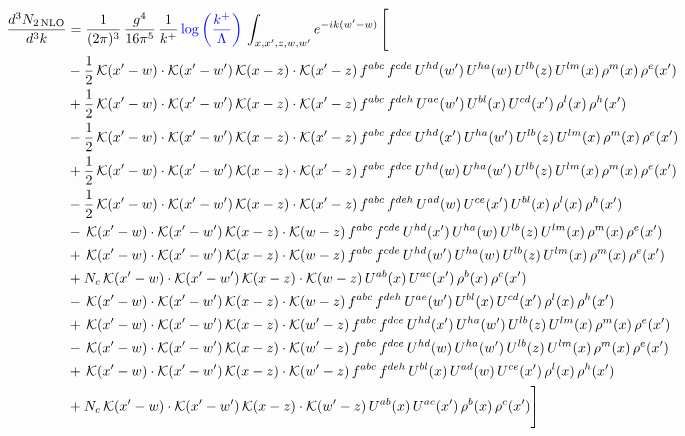 \documentclass[9pt]{article}
\numberwithin{equation}{section}
\begin{document}
\begin{align}
\frac{d^{3}N_{2\,\mathrm{NLO}}}{d^{3}k} & = \frac{1}{(2\pi)^{3}}\,\frac{g^{4}}{16\pi^{5}}\,\frac{1}{k^{+}}\,{\color{blue}\log{\left(\frac{k^{+}}{\Lambda}\right)}}\,\int_{x,x',z,w,w'}e^{-ik(w'-w)}\,\Bigg[\notag\\ & -\frac{1}{2}\,\mathcal{K}(x'-w)\cdot\mathcal{K}(x'-w')\,\mathcal{K}(x-z)\cdot\mathcal{K}(x'-z)\,f^{abc}\,f^{cde}\,U^{hd}(w')\,U^{ha}(w)\,U^{lb}(z)\,U^{lm}(x)\,\rho^{m}(x)\,\rho^{e}(x')\notag\\
& +\frac{1}{2}\,\mathcal{K}(x'-w)\cdot\mathcal{K}(x'-w')\,\mathcal{K}(x-z)\cdot\mathcal{K}(x'-z)\,f^{abc}\,f^{deh}\,U^{ae}(w')\,U^{bl}(x)\,U^{cd}(x')\,\rho^{l}(x)\,\rho^{h}(x')\notag\\
& -\frac{1}{2}\,\mathcal{K}(x'-w)\cdot\mathcal{K}(x'-w')\,\mathcal{K}(x-z)\cdot\mathcal{K}(x'-z)\,f^{abc}\,f^{dce}\,U^{hd}(x')\,U^{ha}(w')\,U^{lb}(z)\,U^{lm}(x)\,\rho^{m}(x)\,\rho^{e}(x')\notag\\
& +\frac{1}{2}\,\mathcal{K}(x'-w)\cdot\mathcal{K}(x'-w')\,\mathcal{K}(x-z)\cdot\mathcal{K}(x'-z)\,f^{abc}\,f^{dce}\,U^{hd}(w)\,U^{ha}(w')\,U^{lb}(z)\,U^{lm}(x)\,\rho^{m}(x)\,\rho^{e}(x')\notag\\
& -\frac{1}{2}\,\mathcal{K}(x'-w)\cdot\mathcal{K}(x'-w')\,\mathcal{K}(x-z)\cdot\mathcal{K}(x'-z)\,f^{abc}\,f^{deh}\,U^{ad}(w)\,U^{ce}(x')\,U^{bl}(x)\,\rho^{l}(x)\,\rho^{h}(x')\notag\\
& -\,\mathcal{K}(x'-w)\cdot\mathcal{K}(x'-w')\,\mathcal{K}(x-z)\cdot\mathcal{K}(w-z)\,f^{abc}\,f^{cde}\,U^{hd}(x')\,U^{ha}(w)\,U^{lb}(z)\,U^{lm}(x)\,\rho^{m}(x)\,\rho^{e}(x') \notag \\ &  +\,\mathcal{K}(x'-w)\cdot\mathcal{K}(x'-w')\,\mathcal{K}(x-z)\cdot\mathcal{K}(w-z)\,f^{abc}\,f^{cde}\,U^{hd}(w')\,U^{ha}(w)\,U^{lb}(z)\,U^{lm}(x)\,\rho^{m}(x)\,\rho^{e}(x')\notag\\
& +N_{c}\,\mathcal{K}(x'-w)\cdot\mathcal{K}(x'-w')\,\mathcal{K}(x-z)\cdot\mathcal{K}(w-z)\,U^{ab}(x)\,U^{ac}(x')\,\rho^{b}(x)\,\rho^{c}(x')\notag\\
& -\,\mathcal{K}(x'-w)\cdot\mathcal{K}(x'-w')\,\mathcal{K}(x-z)\cdot\mathcal{K}(w-z)\,f^{abc}\,f^{deh}\,U^{ae}(w')\,U^{bl}(x)\,U^{cd}(x')\,\rho^{l}(x)\,\rho^{h}(x')\notag\\
& +\,\mathcal{K}(x'-w)\cdot\mathcal{K}(x'-w')\,\mathcal{K}(x-z)\cdot\mathcal{K}(w'-z)\,f^{abc}\,f^{dce}\,U^{hd}(x')\,U^{ha}(w')\,U^{lb}(z)\,U^{lm}(x)\,\rho^{m}(x)\,\rho^{e}(x')\notag\\
& -\,\mathcal{K}(x'-w)\cdot\mathcal{K}(x'-w')\,\mathcal{K}(x-z)\cdot\mathcal{K}(w'-z)\,f^{abc}\,f^{dce}\,U^{hd}(w)\,U^{ha}(w')\,U^{lb}(z)\,U^{lm}(x)\,\rho^{m}(x)\,\rho^{e}(x')\notag\\
& +\,\mathcal{K}(x'-w)\cdot\mathcal{K}(x'-w')\,\mathcal{K}(x-z)\cdot\mathcal{K}(w'-z)\,f^{abc}\,f^{deh}\,U^{bl}(x)\,U^{ad}(w)\,U^{ce}(x')\,\rho^{l}(x)\,\rho^{h}(x')\notag\\
& +N_{c}\,\mathcal{K}(x'-w)\cdot\mathcal{K}(x'-w')\,\mathcal{K}(x-z)\cdot\mathcal{K}(w'-z)\,U^{ab}(x)\,U^{ac}(x')\,\rho^{b}(x)\,\rho^{c}(x')\Bigg]
\end{align}
\end{document}
